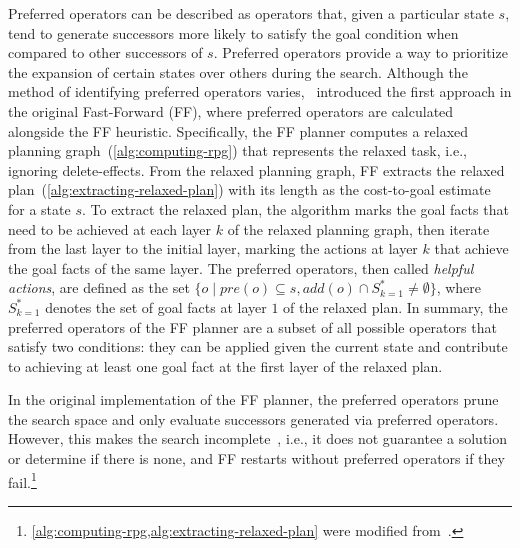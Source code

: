 \documentclass[ppgc,diss,english]{iiufrgs}
\begin{document}
Preferred operators can be described as operators that, given a particular state $s$, tend to generate successors more likely to satisfy the goal condition when compared to other successors of $s$. Preferred operators provide a way to prioritize the expansion of certain states over others during the search. Although the method of identifying preferred operators varies,~\citet{Hoffmann.Nebel/2001} introduced the first approach in the original Fast-Forward (FF), where preferred operators are calculated alongside the FF heuristic.
Specifically, the FF planner computes a relaxed planning graph~(\cref{alg:computing-rpg}) that represents the relaxed task, i.e., ignoring delete-effects. From the relaxed planning graph, FF extracts the relaxed plan~(\cref{alg:extracting-relaxed-plan}) with its length as the cost-to-goal estimate for a state $s$. To extract the relaxed plan, the algorithm marks the goal facts that need to be achieved at each layer $k$ of the relaxed planning graph, then iterate from the last layer to the initial layer, marking the actions at layer $k$ that achieve the goal facts of the same layer. The preferred operators, then called \emph{helpful actions}, are defined as the set $\{o \mid pre(o) \subseteq s, add(o) \cap S_{k=1}^{*} \neq \emptyset \}$, where $S_{k=1}^{*}$ denotes the set of goal facts at layer $1$ of the relaxed plan. In summary, the preferred operators of the FF planner are a subset of all possible operators that satisfy two conditions: they can be applied given the current state and contribute to achieving at least one goal fact at the first layer of the relaxed plan.

In the original implementation of the FF planner, the preferred operators prune the search space and only evaluate successors generated via preferred operators. However, this makes the search incomplete~\cite{Richter.Helmert/2009}, i.e., it does not guarantee a solution or determine if there is none, and FF restarts without preferred operators if they fail.\footnote{\cref{alg:computing-rpg,alg:extracting-relaxed-plan} were modified from~\citet{Wickler.etal/2015}.}
\end{document}
